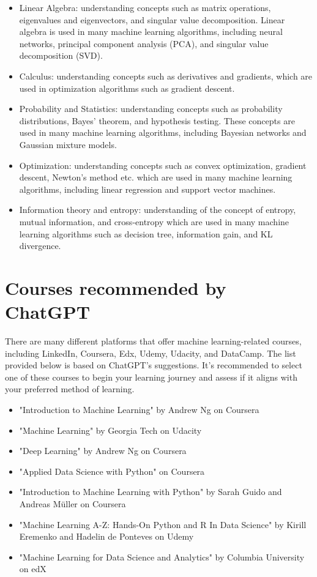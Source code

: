 \begin{itemize}
  \item Linear Algebra:  understanding concepts such as matrix operations, eigenvalues and eigenvectors, and singular value decomposition. Linear algebra is used in many machine learning algorithms, including neural networks, principal component analysis (PCA), and singular value decomposition (SVD).
  \item Calculus: understanding concepts such as derivatives and gradients, which are used in optimization algorithms such as gradient descent.
  \item Probability and Statistics: understanding concepts such as probability distributions, Bayes' theorem, and hypothesis testing. These concepts are used in many machine learning algorithms, including Bayesian networks and Gaussian mixture models.
  \item Optimization: understanding concepts such as convex optimization, gradient descent, Newton's method etc. which are used in many machine learning algorithms, including linear regression and support vector machines.
  \item Information theory and entropy: understanding of the concept of entropy, mutual information, and cross-entropy which are used in many machine learning algorithms such as decision tree, information gain, and KL divergence.
\end{itemize}

\newpage
\section{Courses recommended by ChatGPT}
There are many different platforms that offer machine learning-related courses, including LinkedIn, Coursera, Edx, Udemy, Udacity, and DataCamp. The list provided below is based on ChatGPT's suggestions. It's recommended to select one of these courses to begin your learning journey and assess if it aligns with your preferred method of learning.

\begin{itemize}
  \item "Introduction to Machine Learning" by Andrew Ng on Coursera
  \item "Machine Learning" by Georgia Tech on Udacity
  \item "Deep Learning" by Andrew Ng on Coursera
  \item "Applied Data Science with Python" on Coursera
  \item "Introduction to Machine Learning with Python" by Sarah Guido and Andreas Müller on Coursera
  \item "Machine Learning A-Z: Hands-On Python and R In Data Science" by Kirill Eremenko and Hadelin de Ponteves on Udemy
  \item "Machine Learning for Data Science and Analytics" by Columbia University on edX
\end{itemize}


